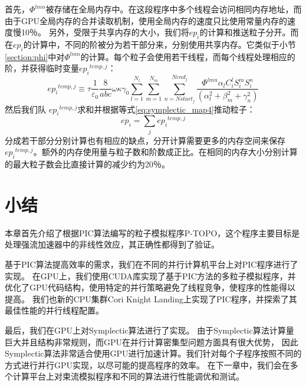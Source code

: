 首先，$\Phi^{lmn}$被存储在全局内存中。在这段程序中多个线程会访问相同内存地址，而由于GPU全局内存的合并读取机制，使用全局内存的速度只比使用常量内存的速度慢10％。
另外，受限于共享内存的大小，我们将$ ep_{i} $的计算和推送粒子分开。而在$ ep_{i} $的计算中，不同的阶被分为若干部分来，分别使用共享内存。它类似于小节 \ref{section:phi}中对$\Phi^{lmn}$的计算。每个粒子会使用若干线程，而每个线程处理相应的阶，并获得临时变量${e{{p}_{i}}^{temp,j}}$：
\begin{equation}
{e{{p}_{i}}^{temp,j}}\equiv \tau \frac{1}{{{\varepsilon }_{0}}}\frac{8}{abc}\omega \kappa {{\gamma }_{0}}\sum\limits_{l=1}^{{{N}_{l}}}{\sum\limits_{m=1}^{{{N}_{m}}}{\sum\limits_{n=Nstar{{t}_{j}}}^{Nen{{d}_{j}}}{\frac{\Phi^{lmn}{{\alpha }_{l}}C_{i}^{l}S_{i}^{m}S_{i}^{n}}{(\alpha _{l}^{2}+\beta _{m}^{2}+\gamma _{n}^{2})}}}}
\end{equation}
然后我们队 ${e{{p}_{i}}^{temp,j}}$求和并根据等式\ref{eq:symplectic_map4}推动粒子：
\begin{equation}
e{{p}_{i}}=\sum\limits_{j}{e{{p}_{i}}^{temp,j}}
\end{equation}
分成若干部分分别计算也有相应的缺点，分开计算需要更多的内存空间来保存~${e{{p}_{i}}^{temp,j}}$。额外的内存使用量与粒子数和阶数成正比。在相同的内存大小分别计算的最大粒子数会比直接计算的减少约为20％。

\section{小结}                            \label{section:Code_conclusion}
本章首先介绍了根据PIC算法编写的粒子模拟程序P-TOPO，这个程序主要目标是处理强流加速器中的非线性效应，其正确性都得到了验证。

基于PIC算法提高效率的需求，我们在不同的并行计算机平台上对PIC程序进行了实现。
在GPU上，我们使用CUDA库实现了基于PIC方法的多粒子模拟程序，并优化了GPU代码结构，使用特定的并行策略避免了线程竞争，使程序的性能得以提高。
我们也新的CPU集群Cori Knight Landing上实现了PIC程序，并探索了其最佳性能的并行线程配置。

最后，我们在GPU上对Symplectic算法进行了实现。
由于Symplectic算法计算量巨大并且结构非常规则，而GPU在并行计算密集型问题方面具有很大优势，
因此Symplectic算法非常适合使用GPU进行加速计算。我们针对每个子程序按照不同的方式进行并行GPU实现，以尽可能的提高程序的效率。
在下一章中，我们会在多个计算平台上对束流模拟程序和不同的算法进行性能调优和测试。